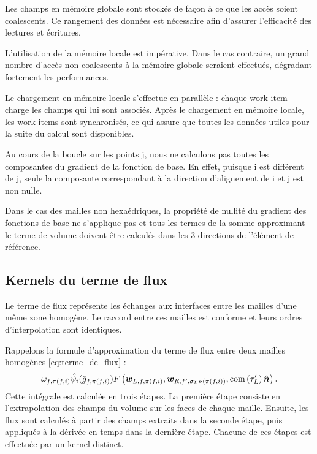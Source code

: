 \begin{remark}
	Les champs en mémoire globale sont stockés de façon à ce que les
	accès soient coalescents. Ce rangement des données est nécessaire 
	afin d'assurer l'efficacité des lectures et écritures.
\end{remark}

\begin{remark}
	L’utilisation de la mémoire locale est impérative. Dans le
	cas contraire, un grand nombre d’accès non coalescents à la mémoire globale
	seraient effectués, dégradant fortement les performances.
\end{remark}

\begin{remark}
	Le chargement en mémoire locale s'effectue en parallèle :
	chaque work-item charge les champs qui lui sont associés.
	Après le chargement en mémoire locale, les work-items sont
	synchronisés, ce qui assure que toutes les données utiles pour la
	suite du calcul sont disponibles.
\end{remark}

\begin{remark}
	Au cours de la boucle sur les points j, nous ne calculons pas toutes
	les composantes du gradient de la fonction de base. En effet,
	puisque i est différent de j, seule la composante correspondant à la direction
	d’alignement de i et j est non nulle.
\end{remark}

\begin{remark}
	Dans le cas des mailles non hexaédriques, la propriété de nullité du gradient
	des fonctions de base ne s'applique pas et tous les termes de la somme
	approximant le terme de volume doivent être calculés dans les $3$ directions
	de l'élément de référence.
	\\
\end{remark}



\subsection{Kernels du terme de flux}
\label{ssect:kernel_surface}

Le terme de flux représente les échanges aux interfaces entre les
mailles d'une même zone homogène. Le raccord entre ces mailles
est conforme et leurs ordres d'interpolation sont identiques.

Rappelons la formule d'approximation du terme de flux entre deux
mailles homogènes \eqref{eq:terme_de_flux} :
\begin{align}
	\omega_{f,\pi(f,i)} \hat{\psi}_{i}(\hat{g}_{f,\pi(f,i)})
	F\left(\bm{w}_{L,f,\pi(f,i)},\bm{w}_{R,f',\sigma_{L R}(\pi(f,i))},\mathrm{com}\left(\tau_{L}'\right) \hat{\bm{n}}\right) .
\end{align}
Cette intégrale est calculée en trois étapes. 
La première étape consiste en l'extrapolation des champs du volume sur les faces de chaque maille.
Ensuite, les flux sont calculés à partir des champs extraits dans la seconde étape,
puis appliqués à la dérivée en temps dans la dernière étape.
Chacune de ces étapes est effectuée par un kernel distinct.


